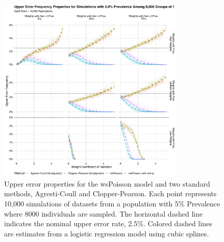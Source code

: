 \documentclass[AMA,STIX1COL]{WileyNJD-v2}
\begin{document}
\begin{figure}
\centering
\includegraphics[width=0.8\textwidth]{figures/perfect_upper_error_frequency_8000_groups_0_05_prev.pdf}
\caption{Upper error properties for the wsPoisson model and two standard methods, Agresti-Coull and Clopper-Pearson.
Each point represents 10,000 simulations of datasets from a population with 5\% Prevalence where 8000 individuals are sampled.
The horizontal dashed line indicates the nominal upper error rate, 2.5\%.
Colored dashed lines are estimates from a logistic regression model using cubic splines.}
\label{fig:perfect_upper_error_frequency_8000_groups_0_05_prev}
\end{figure}

\end{document}
